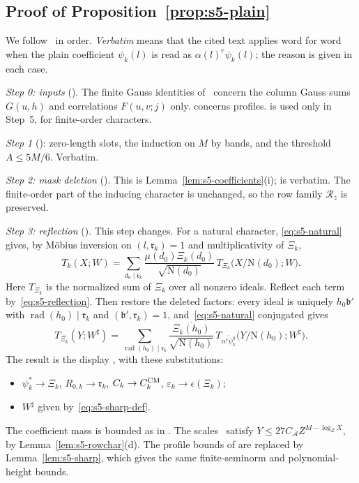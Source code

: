 \documentclass[11pt]{article}
\numberwithin{equation}{section}
\newcommand{\N}{\mathrm N}
\begin{document}
\subsection{Proof of Proposition~\ref{prop:s5-plain}}\label{sec:s5-proof}

We follow~\cite[Section~18]{OAI78} in order. \emph{Verbatim} means that the cited text applies word for
word when the plain coefficient $\psi_k(l)$ is read as $\alpha(l)^e\psi_k(l)$; the reason is given in each
case.

\emph{Step 0: inputs} (\cite[Section~18]{OAI78}). The finite Gauss identities of~\cite[\S 13.3]{OAI78}
concern the column Gauss sums $G(u,h)$ and correlations $F(u,v;j)$ only.
\cite[Lemma~4.5]{OAI78} concerns profiles. \cite[Lemma~4.9]{OAI78}
is used only in Step~5, for finite-order characters.

\emph{Step 1} (\cite[Section~18]{OAI78}): zero-length slots, the induction on $M$ by bands, and the threshold
$A\le5M/6$. Verbatim.

\emph{Step 2: mask deletion} (\cite[Section~18.1]{OAI78}). This is Lemma~\ref{lem:s5-coefficients}(i);
\cite[eq.~(18.6)]{OAI78} is verbatim. The finite-order part of the inducing character is unchanged,
so the row family $\mathcal R_z$ is preserved.

\emph{Step 3: reflection} (\cite[Section~18.1]{OAI78}). This step changes. For a natural character,
\eqref{eq:s5-natural} gives, by M\"obius inversion on $(l,\mathfrak r_k)=1$ and multiplicativity of $\Xi_k$,
\begin{equation}\label{eq:d187}
 T_k(X;W)=\sum_{d_0\mid\mathfrak r_k}\frac{\mu(d_0)\Xi_k(d_0)}{\sqrt{\N(d_0)}}\,T_{\Xi_k}\bigl(X/\N(d_0);W\bigr).
\end{equation}
Here $T_{\Xi_k}$ is the normalized sum of $\Xi_k$ over all nonzero ideals. Reflect each term
by~\eqref{eq:s5-reflection}. Then restore the deleted factors: every ideal is uniquely $h_0\mathfrak b'$
with $\operatorname{rad}(h_0)\mid\mathfrak r_k$ and $(\mathfrak b',\mathfrak r_k)=1$, and~\eqref{eq:s5-natural}
conjugated gives
\begin{equation}\label{eq:d188}
 T_{\overline{\Xi_k}}(Y;W^\sharp)=\sum_{\operatorname{rad}(h_0)\mid\mathfrak r_k}
 \frac{\overline{\Xi_k(h_0)}}{\sqrt{\N(h_0)}}\,T_{\overline{\alpha^e\psi_k^0}}\bigl(Y/\N(h_0);W^\sharp\bigr).
\end{equation}
The result is the display \cite[Section~18.1]{OAI78}, with these substitutions:
\begin{itemize}
\item $\psi_k^*\to\Xi_k$, $R_{0,k}\to\mathfrak r_k$, $C_k\to C_k^{\rm CM}$, $\varepsilon_k\to\epsilon(\Xi_k)$;
\item $W^\sharp$ given by~\eqref{eq:s5-sharp-def}.
\end{itemize}
The coefficient mass is bounded as in \cite[Section~18.1]{OAI78}. The scales~\cite[eq.~(18.8)]{OAI78} satisfy
$Y\le27C_{\mathcal A}Z^{M-\log_ZX}$, by Lemma~\ref{lem:s5-rowchar}(d). The profile bounds of \cite[Section~18.1]{OAI78}
are replaced by Lemma~\ref{lem:s5-sharp}, which gives the same finite-seminorm and polynomial-height
bounds.
\end{document}

